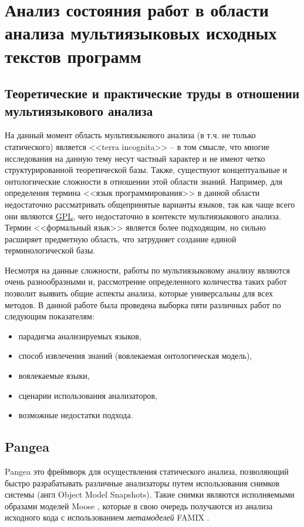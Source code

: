 \section{Анализ состояния работ в области анализа мультиязыковых исходных текстов программ} \label{sec:num2}

\subsection{Теоретические и практические труды в отношении мультиязыкового анализа} \label{ssec:num2}

На данный момент область мультиязыкового анализа (в т.ч. не только статического) является
<<terra incognita>> -- в том смысле, что многие исследования на данную тему несут частный характер и не
имеют четко структурированной теоретической базы. Также, существуют концептуальные и онтологические сложности
в отношении этой области знаний. Например, для определения термина <<язык программирования>> в данной области
недостаточно рассматривать общепринятые варианты языков, так как чаще всего они являются \hyperlink{GPL}{GPL},
чего недостаточно в контексте мультиязыкового анализа. Термин <<формальный язык>> является более подходящим, но
сильно расширяет предметную область, что затрудняет создание единой терминологической базы.

Несмотря на данные сложности, работы по мультиязыковому анализу являются очень разнообразными и, рассмотрение
определенного количества таких работ позволит выявить общие аспекты анализа, которые универсальны для всех методов.
В данной работе была проведена выборка пяти различных работ по следующим показателям:
\begin{itemize}
    \item парадигма анализируемых языков,
    \item способ извлечения знаний (вовлекаемая онтологическая модель),
    \item вовлекаемые языки,
    \item сценарии использования анализаторов,
    \item возможные недостатки подхода.
\end{itemize}

\subsection{Pangea} \label{ssec:pangea}

Pangea \cite{pangea} это фреймворк для осуществления статического анализа, позволяющий
быстро разрабатывать различные анализаторы путем использования снимков системы (англ Object Model Snapshots).
Такие снимки являются исполняемыми образами моделей Moose \cite{moose}, которые в свою очередь получаются из
анализа исходного кода с использованием \textit{метамоделей} FAMIX \cite{famix}.

